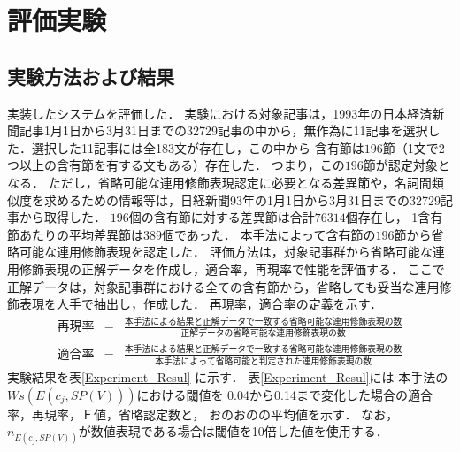 \section{評価実験}
\subsection{実験方法および結果}
実装したシステムを評価した．
実験における対象記事は，1993年の日本経済新聞記事1月1日から3月31日までの32729記事の中から，無作為に11記事を選択した．選択した11記事には全183文が存在し，この中から
含有節は$196$節（1文で2つ以上の含有節を有する文もある）存在した．
つまり，この$196$節が認定対象となる．
ただし，省略可能な連用修飾表現認定に必要となる差異節や，名詞間類似度を求めるための情報等は，日経新聞93年の1月1日から3月31日までの32729記事から取得した．
$196$個の含有節に対する差異節は合計$76314$個存在し，
1含有節あたりの平均差異節は$389$個であった．
本手法によって含有節の$196$節から省略可能な連用修飾表現を認定した．
評価方法は，対象記事群から省略可能な連用修飾表現の正解データを作成し，適合率，再現率で性能を評価する．
ここで正解データは，対象記事群における全ての含有節から，省略しても妥当な連用修飾表現を人手で抽出し，作成した．
再現率，適合率の定義を示す．
\begin{eqnarray}
  再現率 &=& \frac{本手法による結果と正解データで一致する省略可能な連用修飾表現の数}{正解データの省略可能な連用修飾表現の数}\nonumber
\end{eqnarray}
\begin{eqnarray}
  適合率 &=& \frac{本手法による結果と正解データで一致する省略可能な連用修飾表現の数}{本手法によって省略可能と判定された連用修飾表現の数}\nonumber
\end{eqnarray}
実験結果を表\ref{Experiment_Resul} に示す．
表\ref{Experiment_Resul}には
本手法の$Ws(E(c_{j},SP(V)))$における閾値を
0.04から0.14まで変化した場合の適合率，再現率，Ｆ値，省略認定数と，
おのおのの平均値を示す．
なお，
$n_{E(c_{j},SP(V))}$が数値表現である場合は閾値を10倍した値を使用する．
